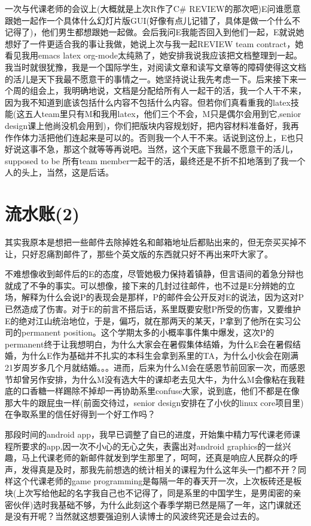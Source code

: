 \documentclass[12pt]{book}
\begin{document}
一次与代课老师的会议上(大概就是上次R作了C\# REVIEW的那次吧)E问谁愿意跟她一起作一个具体什么幻灯片版GUI(好像有点儿记错了，具体是做一个什么不记得了)，他们男生都想跟她一起做。会后我问E我能否回入到他们一起，E就说她想好了一件更适合我的事让我做，她说上次与我一起REVIEW team contract，她看见我用emacs latex org-mode太纯熟了，她安排我说我应该把文档整理到一起。我当时就很犹豫，我是一个国际学生，对阅读文章和读写文章等的障碍使得这文档的活儿是天下我最不愿意干的事情之一。她坚持说让我先考虑一下。后来接下来一个周的组会上，我明确地说，文档是分配给所有人一起干的活，我一个人干不来，因为我不知道到底该包括什么内容不包括什么内容。但若你们真看重我的latex技能(这五人team里只有M和我用latex，他们三个不会，M只是偶尔会用到它,senior design课上他尚没机会用到)，你们把版块内容规划好，把内容材料准备好，我再作作体力活把他们连起来是可以的。否则我一个人干不来。话说到这份上，E也只好说这事不急，那这个就等等再说吧。当然，这个天底下我最不愿意干的活儿，supposed to be 所有team member一起干的活，最终还是不折不扣地落到了我一个人的头上，当然，这是后话。
\section{流水账(2)}
\label{sec-24-2}
其实我原本是想把一些邮件去除掉姓名和邮箱地址后都贴出来的，但无奈买买掉不让，只好忍痛割邮件了，那些个英文版的东西就只好不再出来吓大家了。

不难想像收到邮件后的E的态度，尽管她极力保持着镇静，但言语间的着急分辩也就成了不争的事实。可以想像，接下来的几封过往邮件，也不过是E分辨她的立场，解释为什么会说P的表现会是那样，P的邮件会公开反对E的说法，因为这对P已然造成了伤害。对于E的前言不搭后话，系里既要安慰P所受的伤害，又要维护E的绝对江山统治地位，于是，偏巧，就在那两天的某天，P拿到了他所在实习公司的permanent position。这个学期太多的小概率事件集中爆发，这次P的permanent终于让我想明白，为什么大家会在暑假集体结婚，为什么E会在暑假结婚，为什么E作为基础并不扎实的本科生会拿到系里的TA，为什么小伙会在刚满21岁周岁多几个月就结婚。。。进而，后来为什么M会在感恩节前回家一次，而感恩节却曾另作安排，为什么M没有选大牛的课却老去见大牛，为什么M会像粘在我鞋底的口香糖一样踢除不掉却一再协助系里confuse大家，说到底，他们不都是在像那大牛的跟屁虫一样(前面交待过，senior design安排在了小伙的linux core项目里)在争取系里的信任好得到一个好工作吗？

那段时间的android app，我早已调整了自已的进度，开始集中精力写代课老师课程所要求的app,因一次不小心的无心之失，表露出对android graphics的一丝兴趣，马上代课老师的新邮件就发到学生那里了，呵呵，还真是响应人民群众的呼声，发得真是及时，那我先前想选的统计相关的课程为什么这年头一门都不开？同样这个代课老师的game programming是每隔一年的春天开一次，上次板砖还是板块(上次写给他起的名字我自己也不记得了，同是系里的中国学生，是男闺密的亲密伙伴)选时我基础不够，为什么此刻这个春季学期已然是隔了一年，这门课就还是没有开呢？当然就这想要强迫别人读博士的风波终究还是会过去的。
\end{document}
